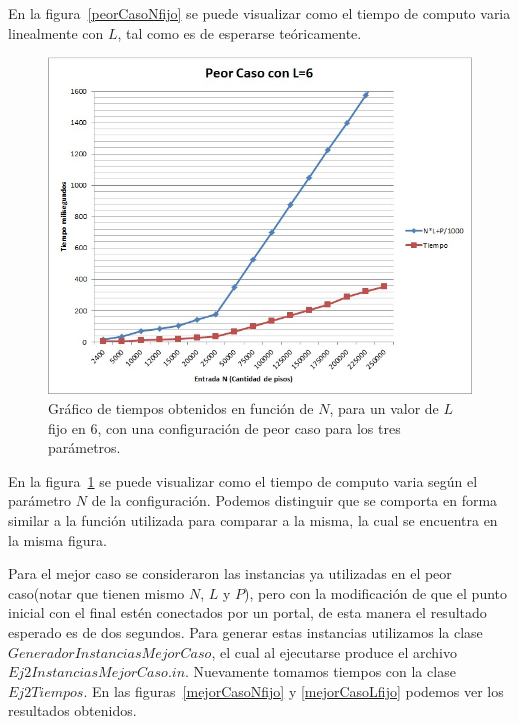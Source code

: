 En la figura~\ref{peorCasoNfijo} se puede visualizar como el tiempo de computo varia linealmente con $ L $, tal como es de esperarse teóricamente.
\begin{figure}[H]
\centering
\includegraphics[scale=0.6]{../PeorCasoEj2Lfijo.jpg}
\caption{Gráfico de tiempos obtenidos en función de $N$, para un valor de $ L $  fijo en 6, con una configuración de peor caso para los tres parámetros.}
\label{peorCasoLfijo}
\end{figure}

En la figura~\ref{peorCasoLfijo} se puede visualizar como el tiempo de computo varia según el parámetro $ N $ de la configuración. Podemos distinguir que se comporta en forma similar a la función utilizada para comparar a la misma, la cual se encuentra en la misma figura.

Para el mejor caso se consideraron las instancias ya utilizadas en el peor caso(notar que tienen mismo $ N $, $ L $ y $ P $), pero con la modificación de que el punto inicial con el final estén conectados por un portal, de esta manera el resultado esperado es de dos segundos. Para generar estas instancias utilizamos la clase $ GeneradorInstanciasMejorCaso $, el cual al ejecutarse produce el archivo $ Ej2InstanciasMejorCaso.in $. Nuevamente tomamos tiempos con la clase $ Ej2Tiempos $. En las figuras~\ref{mejorCasoNfijo} y \ref{mejorCasoLfijo} podemos ver los resultados obtenidos.

